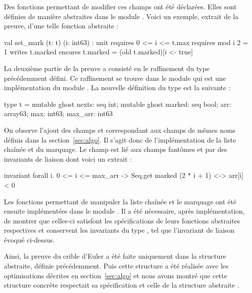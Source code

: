 \documentclass[a4paper]{easychair}
\begin{document}
Des fonctions permettant de modifier ces champs ont été déclarées.
Elles sont définies de manière abstraites dans le module .
Voici un exemple, extrait de la preuve, d'une telle fonction abstraite :
\begin{why3}
val set_mark (t: t) (i: int63) : unit
  requires { 0 <= i <= t.max }
  requires { mod i 2 = 1 }
  writes   { t.marked }
  ensures  { t.marked = (old t.marked)[i <- true] }
\end{why3}

\clearpage
La deuxième partie de la preuve a consisté en le raffinement du type 
précédemment défini. Ce raffinement se trouve dans le module
 qui est une implémentation du module .
La nouvelle définition du type  est la suivante :
\begin{why3}
type t = {
  mutable ghost nexts: seq int;
  mutable ghost marked: seq bool;
  arr: array63;
  max: int63;
  max_arr: int63
}
\end{why3}
On observe l'ajout des champs  et 
correspondant aux champs de mêmes noms définis dans la section~\ref{sec:algo}.
Il s'agit donc de l'implémentation de la liste chaînée et du marquage.
Le champ  est lié aux champs fantômes  et 
par des invariants de liaison dont voici un extrait :
\begin{why3}
invariant { forall i. 0 <= i <= max_arr ->
                 Seq.get marked (2 * i + 1) <-> arr[i] < 0 }
\end{why3}
Les fonctions permettant de manipuler la liste chaînée et le marquage ont été
ensuite implémen\-tées dans le module .
Il a été nécessaire, après implémentation, de montrer que celles-ci
satisfont les spécifications de leurs fonctions abstraites respectives et
conservent les invariants du type , tel que l'invariant de liaison
évoqué ci-dessus.

Ainsi, la preuve du crible d'Euler a été faite uniquement dans la
structure  abstraite, définie précédemment.
Puis cette structure  a été réalisée avec les optimisations
décrites en section~\ref{sec:algo} et nous avons montré que cette structure
concrète respectait sa spécification et celle de la structure abstraite
.
\end{document}
